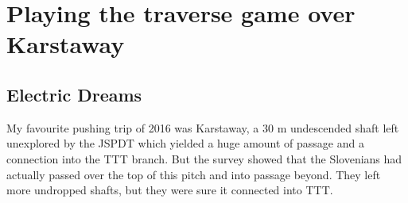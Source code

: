\section{Playing the traverse game over Karstaway}

\subsection{Electric Dreams}
\begin{marginfigure}
\end{marginfigure}

My favourite pushing trip of 2016 was Karstaway, a 30 m undescended shaft left unexplored by the JSPDT which yielded a huge amount of passage and a connection into the TTT branch. But the survey showed that the Slovenians had actually passed over the top of this pitch and into passage beyond. They left more undropped shafts, but they were sure it connected into TTT.


